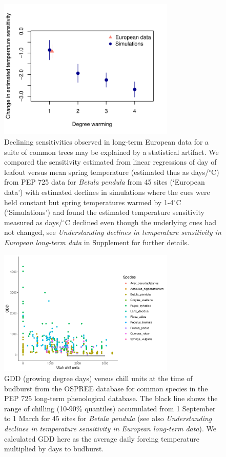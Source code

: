\documentclass{article}
\begin{document}
\newpage
\begin{figure}[h!]
\centering
\noindent \includegraphics[width=0.75\textwidth]{..//..//analyses/bb_analysis/PEP_climate/figures/peprealandsims.pdf}
\caption{Declining sensitivities observed in long-term European data for a suite of common trees may be explained by a statistical artifact. We compared the sensitivity estimated from linear regressions of day of leafout versus mean spring temperature (estimated thus as days/$^{\circ}$C) from PEP 725 data for \emph{Betula pendula} from 45 sites (`European data') with estimated declines in simulations where the cues were held constant but spring temperatures warmed by 1-4$^{\circ}$C (`Simulations') and found the estimated temperature sensitivity measured as days/$^{\circ}$C declined even though the underlying cues had not changed, see \emph{Understanding declines in temperature sensitivity in European long-term data} in Supplement for further details.}
\label{fig:pepsims}
\end{figure}

\newpage
\begin{figure}[h!]
\centering
\noindent \includegraphics[width=0.75\textwidth]{..//..//analyses/bb_analysis/figures/gddbyutah_pepspp.pdf}
\caption{GDD (growing degree days) versus chill units at the time of budburst from the OSPREE database for common species in the PEP 725 long-term phenological database. The black line shows the range of chilling (10-90\% quantiles) accumulated from 1 September to 1 March for 45 sites for \emph{Betula pendula} (see also \emph{Understanding declines in temperature sensitivity in European long-term data}). We calculated GDD  here as the average daily forcing temperature multiplied by days to budburst. }
\label{fig:pepgddchill}
\end{figure}



\end{document}
